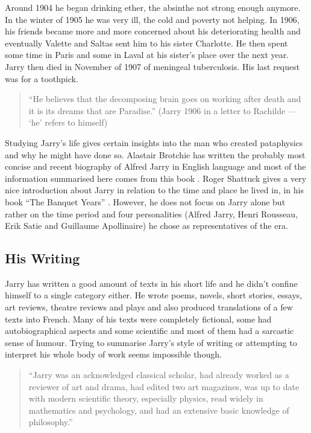 Around 1904 he began drinking ether, the absinthe not strong enough anymore. In the winter of 1905 he was very ill, the cold and poverty not helping. In 1906, his friends became more and more concerned about his deteriorating health and eventually Valette and Saltas sent him to his sister Charlotte. He then spent some time in Paris and some in Laval at his sister's place over the next year. Jarry then died in November of 1907 of meningeal tuberculosis. His last request was for a toothpick.

\begin{quote}
  ``He believes that the decomposing brain goes on working after death and it is its dreams that are Paradise.'' (Jarry 1906 in a letter to Rachilde \autocite{Brotchie2007} --- `he' refers to himself)
\end{quote}

Studying Jarry's life gives certain insights into the man who created pataphysics and why he might have done so. Alastair Brotchie has written the probably most concise and recent biography of Alfred Jarry in English language and most of the information summarised here comes from this book \autocite{Brotchie2011}. Roger Shattuck gives a very nice introduction about Jarry in relation to the time and place he lived in, in his book ``The Banquet Years'' \autocite{Shattuck1959}. However, he does not focus on Jarry alone but rather on the time period and four personalities (Alfred Jarry, Henri Rousseau, Erik Satie and Guillaume Apollinaire) he chose as representatives of the era.


\subsection*{His Writing}

Jarry has written a good amount of texts in his short life and he didn't confine himself to a single category either. He wrote poems, novels, short stories, essays, art reviews, theatre reviews and plays and also produced translations of a few texts into French. Many of his texts were completely fictional, some had autobiographical aspects and some scientific and most of them had a sarcastic sense of humour. Trying to summarise Jarry's style of writing or attempting to interpret his whole body of work seems impossible though.

\begin{quote}
  ``Jarry was an acknowledged classical scholar, had already worked as a reviewer of art and drama, had edited two art magazines, was up to date with modern scientific theory, especially physics, read widely in mathematics and psychology, and had an extensive basic knowledge of philosophy.'' \autocite{Brotchie2011}
\end{quote}

